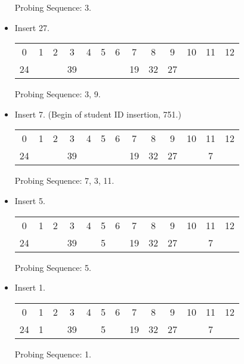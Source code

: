 \documentclass{article}
\begin{document}
\begin{itemize}
    Probing Sequence: 3.

    \item Insert 27.

    \begin{center}
        \begin{tabular}{c c c c c c c c c c c c c}
            0 & 1 & 2 & 3 & 4 & 5 & 6 & 7 & 8 & 9 & 10 & 11 & 12 \\
            24&   &   & 39&   &   &   & 19& 32& 27&    &    &    \\
        \end{tabular}
    \end{center}

    Probing Sequence: 3, 9.

    \item Insert 7. (Begin of student ID insertion, 751.)
    
    \begin{center}
        \begin{tabular}{c c c c c c c c c c c c c}
            0 & 1 & 2 & 3 & 4 & 5 & 6 & 7 & 8 & 9 & 10 & 11 & 12 \\
            24&   &   & 39&   &   &   & 19& 32& 27&    & 7  &    \\
        \end{tabular}
    \end{center}

    Probing Sequence: 7, 3, 11.

    \item Insert 5.
    
    \begin{center}
        \begin{tabular}{c c c c c c c c c c c c c}
            0 & 1 & 2 & 3 & 4 & 5 & 6 & 7 & 8 & 9 & 10 & 11 & 12 \\
            24&   &   & 39&   & 5 &   & 19& 32& 27&    & 7  &    \\
        \end{tabular}
    \end{center}

    Probing Sequence: 5.

    \item Insert 1.
    
    \begin{center}
        \begin{tabular}{c c c c c c c c c c c c c}
            0 & 1 & 2 & 3 & 4 & 5 & 6 & 7 & 8 & 9 & 10 & 11 & 12 \\
            24& 1 &   & 39&   & 5 &   & 19& 32& 27&    & 7  &    \\
        \end{tabular}
    \end{center}

    Probing Sequence: 1.
\end{itemize}
\end{document}
